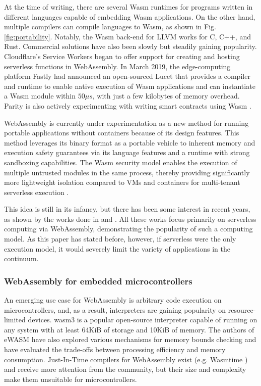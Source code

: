 At the time of writing, there are several Wasm runtimes for programs written in different languages capable of embedding Wasm applications. On the other hand, multiple compilers can compile languages to Wasm, as shown in Fig. \ref{fig:portability}. Notably, the Wasm back-end for LLVM \cite{llvm} works for C, C++, and Rust. Commercial solutions have also been slowly but steadily gaining popularity. Cloudflare's Service Workers \cite{cloudflare-workers} began to offer support for creating and hosting serverless functions in WebAssembly. In March 2019, the edge-computing platform Fastly had announced an open-sourced Lucet \cite{fastly-lucet} that provides a compiler and runtime to enable native execution of Wasm applications and can instantiate a Wasm module within $50\mu s$, with just a few kilobytes of memory overhead. Parity is also actively experimenting with writing smart contracts using Wasm \cite{parity-wasm}.

WebAssembly is currently under experimentation as a new method for running portable applications without containers because of its design features. This method leverages its binary format as a portable vehicle to inherent memory and execution safety guarantees via its language features and a runtime with strong sandboxing capabilities. The Wasm security model enables the execution of multiple untrusted modules in the same process, thereby providing significantly more lightweight isolation compared to VMs and containers for multi-tenant serverless execution \cite{gadepalli2020sledge}.

This idea is still in its infancy, but there has been some interest in recent years, as shown by the works done in \cite{hall2019execution} and \cite{shillaker2020faasm}. All these works focus primarily on serverless computing via WebAssembly, demonstrating the popularity of such a computing model. As this paper has stated before, however, if serverless were the only execution model, it would severely limit the variety of applications in the continuum.

\subsubsection{WebAssembly for embedded microcontrollers}

An emerging use case for WebAssembly is arbitrary code execution on microcontrollers, and, as a result, interpreters are gaining popularity on resource-limited devices. wasm3 \cite{wasm3} is a popular open-source interpreter capable of running on any system with at least 64KiB of storage and 10KiB of memory. The authors of eWASM \cite{peach2020ewasm} have also explored various mechanisms for memory bounds checking and have evaluated the trade-offs between processing efficiency and memory consumption. Just-In-Time compilers for WebAssembly exist (e.g. Wasmtime \cite{wasmtime}) and receive more attention from the community, but their size and complexity make them unsuitable for microcontrollers.

